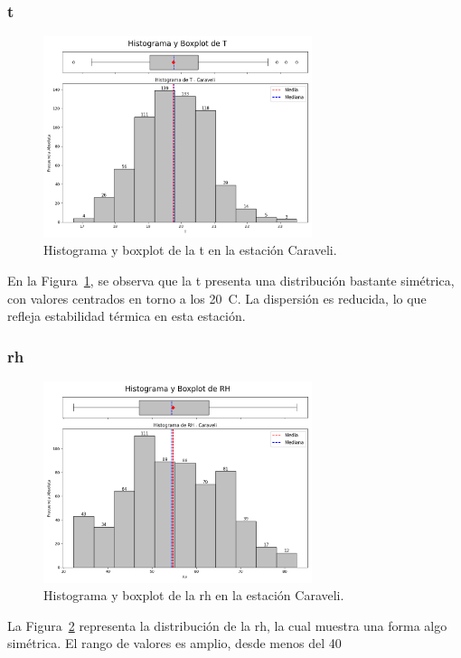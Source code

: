 \subsubsection*{\gls{t} }
\begin{figure}[htbp]
\centering
\includegraphics[width=0.7\textwidth]{resultados/por_estacion_meteorologica/Caraveli/T_histograma.png}
\caption{Histograma y boxplot de la \gls{t}  en la estación Caraveli.}
\label{fig:caraveli_T}
\end{figure}
En la Figura~\ref{fig:caraveli_T}, se observa que la \gls{t} presenta una distribución bastante simétrica, con valores centrados en torno a los 20~\textdegree C. La dispersión es reducida, lo que refleja estabilidad térmica en esta estación.

\subsubsection*{\gls{rh} }
\begin{figure}[htbp]
\centering
\includegraphics[width=0.7\textwidth]{resultados/por_estacion_meteorologica/Caraveli/RH_histograma.png}
\caption{Histograma y boxplot de la \gls{rh}  en la estación Caraveli.}
\label{fig:caraveli_RH}
\end{figure}
La Figura~\ref{fig:caraveli_RH} representa la distribución de la \gls{rh}, la cual muestra una forma algo simétrica. El rango de valores es amplio, desde menos del 40%

